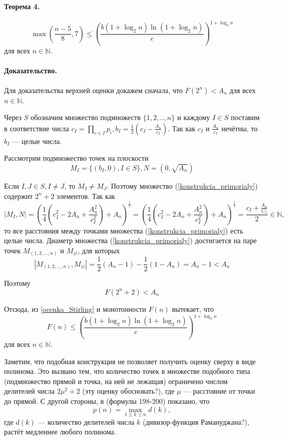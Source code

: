 \documentclass[a4paper,14pt]{article} %
\begin{document}
\paragraph{Теорема 4.}
$$
 \max\left( \frac{n-5}{8}, 7  \right) \leq \left( \frac{b (1+\log_2 n )\ln (1 + \log_2 n)}{e}\right)^{1+\log_2 n}
$$
для всех $n\in\mathbb{N}$.

\paragraph{Доказательство.}
Для доказательства верхней оценки докажем сначала, что
$F(2^n)<A_n$ для всех $n\in\mathbb{N}$.

Через $S$ обозначим множество подмножеств $\{1,2,..,n\}$ и каждому $I\in S$ поставим в соответствие числа $c_I=\prod\limits_{c\in I}p_i, b_I=\frac{1}{2}\left(c_I-\frac{A_n}{c_I}\right)$.
Так как $c_I$ и $\frac{A_n}{c_I}$ нечётны, то $b_I$ --- целые числа.

Рассмотрим подмножество точек на плоскости
\begin{equation}\label{konstrukcia_primorialy}
M_I=\{(b_I,0), I\in S\}, N=(0, \sqrt{A_n})
\end{equation}

Если $I,J \in S, I \neq J$, то $M_I \neq M_J$.
Поэтому множество (\ref{konstrukcia_primorialy}) содержит $2^n+2$ элементов.
Так как
\begin{equation*}
	|M_I,N|=\left(\frac{1}{4}\left( c_I^2 - 2 A_n + \frac{A_n^2}{c_I^2} \right)+A_n\right)^\frac{1}{2}=
	\left(\frac{1}{4}\left( c_I^2 - 2 A_n + \frac{A_n^2}{c_I^2} \right)+A_n\right)^\frac{1}{2}=
	\frac{c_I+\frac{A_n}{C_I}}{2} \in \mathbb{N},
\end{equation*}
то все расстояния между точками множества (\ref{konstrukcia_primorialy}) есть целые числа.
Диаметр множества (\ref{konstrukcia_primorialy}) достигается на паре точек $M_{(1,2,...,n)}$ и $M_{\varnothing}$, для которых
$$
|M_{(1,2,...,n)},M_{\varnothing}|=\frac{1}{2}(A_n-1)-\frac{1}{2}(1-A_n) = A_n-1 < A_n
$$

Поэтому 
$$
F(2^n+2) < A_n
$$

Отсюда, из \ref{ocenka_Stirling} и монотонности $F(n)$ вытекает, что
\begin{equation}\label{ocenka_primoryaly}
	F(n) \leq \left( \frac{b (1+\log_2 n )\ln (1 + \log_2 n)}{e}\right)^{1+\log_2 n}
\end{equation}
для всех $n\in \mathbb{N}$.


Заметим, что подобная конструкция не позволяет получить оценку сверху в виде полинома.
Это вызвано тем, что количество точек в множестве подобного типа (подмножество прямой и точка, на ней не лежащая) ограничено числом  делителей числа $2\mu^2+2$ (эту оценку обосновать?), где $\mu$ --- расстояние от точки до прямой.
С другой стороны, в \cite{Ramanujan} (формулы 198-200) показано, что
$$
p(n)=\max\limits_{1\leq k \leq n} d(k),
$$
где $d(k)$ --- количество делителей числа $k$ (дивизор-функция Рамануджана?),
растёт медленнее любого полинома.
\end{document}
